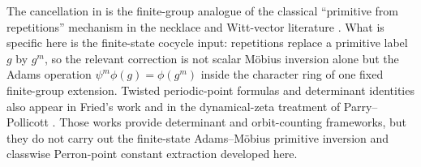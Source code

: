 \begin{remark}
  \label{rem:adams-mobius-literature-position}
  The cancellation in
   is the finite-group analogue
  of the classical ``primitive from repetitions'' mechanism in the
  necklace and Witt-vector literature
  \cite{MetropolisRota1983Necklaces,Wehrhahn1990AperiodicRings}. What
  is specific here is the finite-state cocycle input:
  repetitions replace a primitive label \(g\) by \(g^m\), so the
  relevant correction is not scalar M\"obius inversion alone but the
  Adams operation \(\psi^m\phi(g)=\phi(g^m)\) inside the character ring
  of one fixed finite-group extension. Twisted periodic-point formulas
  and determinant identities also appear in Fried's work
  \cite{Fried1983PeriodicPointsTwistedCoefficients,Fried1983HomologicalIdentitiesClosedOrbits} and in the dynamical-zeta
  treatment of Parry--Pollicott \cite{ParryPollicott1990Zeta}. Those
  works provide determinant and orbit-counting frameworks, but they do
  not carry out the finite-state Adams--M\"obius primitive inversion and
  classwise Perron-point constant extraction developed here.
\end{remark}
